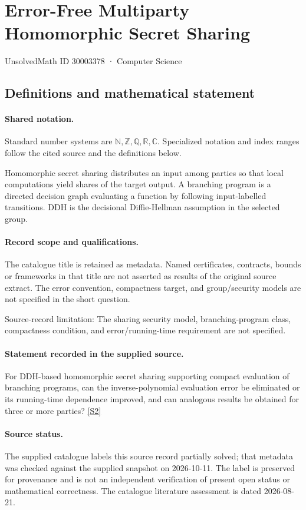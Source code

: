 \documentclass[11pt]{article}
\newcommand{\sref}[2]{\hyperlink{source:#1:#2}{[S#2]}}
\begin{document}
\setcounter{section}{30003377}
\section{Error-Free Multiparty Homomorphic Secret Sharing}\label{30003378}
{\small\sffamily UnsolvedMath ID 30003378 · Computer Science}
\subsection{Definitions and mathematical statement}

\paragraph{Shared notation.}Standard number systems are $\mathbb N,\mathbb Z,\mathbb Q,\mathbb R,\mathbb C$. Specialized notation and index ranges follow the cited source and the definitions below.


Homomorphic secret sharing distributes an input among parties so that local computations yield shares of the target output. A branching program is a directed decision graph evaluating a function by following input-labelled transitions. DDH is the decisional Diffie-Hellman assumption in the selected group.
\paragraph{Record scope and qualifications.}
The catalogue title is retained as metadata. Named certificates, contracts, bounds or frameworks in that title are not asserted as results of the original source extract.
The error convention, compactness target, and group/security models are not specified in the short question.

Source-record limitation: The sharing security model, branching-program class, compactness condition, and error/running-time requirement are not specified.
\paragraph{Statement recorded in the supplied source.}
For DDH-based homomorphic secret sharing supporting compact evaluation of branching programs, can the inverse-polynomial evaluation error be eliminated or its running-time dependence improved, and can analogous results be obtained for three or more parties? \sref{30003378}{2}
\paragraph{Source status.}
The supplied catalogue labels this source record partially solved; that metadata was checked against the supplied snapshot on 2026-10-11. The label is preserved for provenance and is not an independent verification of present open status or mathematical correctness. The catalogue literature assessment is dated 2026-08-21.
\end{document}
